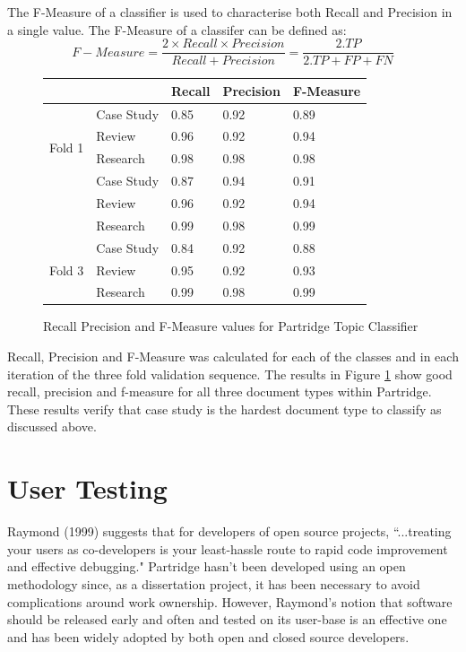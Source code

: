 The F-Measure of a classifier is used to characterise both Recall and Precision
in a single value. The F-Measure of a classifer can be defined as:
\[
F-Measure = \frac{ 2 \times Recall \times Precision} { Recall + Precision } = 
\frac{2 . TP}{ 2 . TP + FP + FN }
\]


\begin{figure}[!th]

\centering
\begin{tabular}{| l | l | l | l | l |}
\hline
&        &\textbf{Recall}&\textbf{Precision}&\textbf{F-Measure}\\
\hline
\hline
\multirow{4}{*}{Fold 1} & Case Study & 0.85 & 0.92 & 0.89 \\
                        & Review     & 0.96 & 0.92 & 0.94 \\
                        & Research   & 0.98 & 0.98 & 0.98 \\
\hline

\multirow{4}{*}{Fold 2} & Case Study & 0.87 & 0.94 & 0.91 \\
                        & Review     & 0.96 & 0.92 & 0.94 \\
                        & Research   & 0.99 & 0.98 & 0.99 \\

\hline

\multirow{4}{*}{Fold 3} &Case Study & 0.84 & 0.92 & 0.88 \\
                        & Review    & 0.95 & 0.92 & 0.93 \\
                        & Research  & 0.99 & 0.98 & 0.99 \\


\hline


\end{tabular}

\caption{Recall Precision and F-Measure values for Partridge Topic Classifier}
\label{fig:fmeasure_table}

\end{figure}

Recall, Precision and F-Measure was calculated for each of the classes and in
each iteration of the three fold validation sequence. The results in Figure
\ref{fig:fmeasure_table} show good recall, precision and f-measure for all
three document types within Partridge. These results verify that case study is
the hardest document type to classify as discussed above.

\section{ User Testing } 
\label{sec:user_testing}
Raymond (1999) suggests that for developers of open source projects, ``...treating
your users as co-developers is your least-hassle route to rapid code
improvement and effective debugging\cite{raymond1999cathedral}." Partridge
hasn't been developed using an open methodology since, as a dissertation
project, it has been necessary to avoid complications around work ownership.
However, Raymond's notion that software should be released early and often and
tested on its user-base is an effective one and has been widely adopted by both
open and closed source developers\cite{linux2013}\cite{unity2013}.


